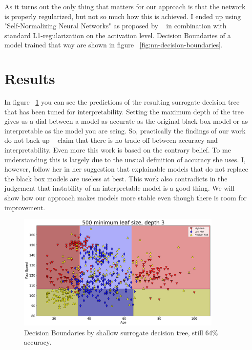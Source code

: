 \documentclass{article} %
\begin{document}
As it turns out the only thing that matters for our approach is that the network is properly regularized, but not so much how this is achieved. I ended up using "Self-Normalizing Neural Networks" as proposed by ~\citep{klambauer2017selfnormalizing} in combination with standard L1-regularization on the activation level. Decision Boundaries of a model trained that way are shown in figure ~\ref{fig:nn-decision-boundaries}.

\section{Results}

In figure ~\ref{fig:surrogate-model} you can see the predictions of the resulting surrogate decision tree that has been tuned for interpretability. Setting the maximum depth of the tree gives us a dial between a model as accurate as the original black box model or as interpretable as the model you are seing. So, practically the findings of our work do not back up ~\citep{rudin2018stop} claim that there is no trade-off between accuracy and interpretability. Even more this work is based on the contrary belief. To me understanding this is largely due to the unsual definition of accuracy she uses. I, however, follow her in her suggestion that explainable models that do not replace the black box models are useless at best. This work also contradicts in the judgement that instability of an interpretable model is a good thing. We will show how our approach makes models more stable even though there is room for improvement.

\begin{figure}[h]
\begin{center}
\includegraphics[width=4.0in]{shallow-surrogate.png}
\end{center}
\caption{Decision Boundaries by shallow surrogate decision tree, still 64\% accuracy.}
\label{fig:surrogate-model}
\end{figure}
\end{document}
